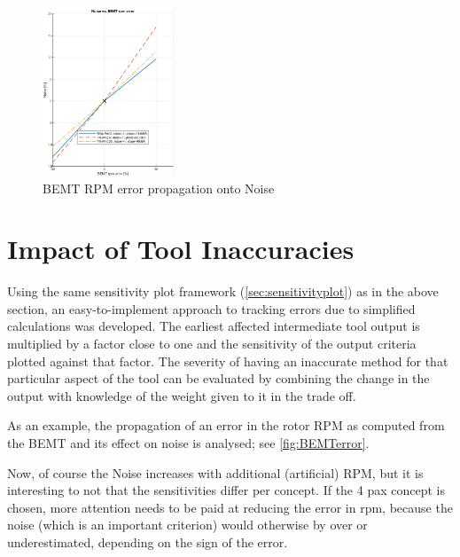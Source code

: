 \begin{figure}
    \centering
    \includegraphics[width=0.35\textwidth]{Figures/NoiseBEMT.PNG}
    \captionsetup{justification=centering}
    \caption{BEMT RPM error propagation onto Noise}
    \label{fig:BEMTerror}
\end{figure}

\section{Impact of Tool Inaccuracies} \label{sec:errorSensitivity}



Using the same sensitivity plot framework (\autoref{sec:sensitivityplot}) as in the above section, an easy-to-implement approach to tracking errors due to simplified calculations was developed. The earliest affected intermediate tool output is multiplied by a factor close to one and the sensitivity of the output criteria plotted against that factor. The severity of having an inaccurate method for that particular aspect of the tool can be evaluated by combining the change in the output with knowledge of the weight given to it in the trade off.

As an example, the propagation of an error in the rotor RPM as computed from the BEMT and its effect on noise is analysed; see \autoref{fig:BEMTerror}.



Now, of course the Noise increases with additional (artificial) RPM, but it is interesting to not that the sensitivities differ per concept. If the 4 pax concept is chosen, more attention needs to be paid at reducing the error in rpm, because the noise (which is an important criterion) would otherwise by over or underestimated, depending on the sign of the error.





